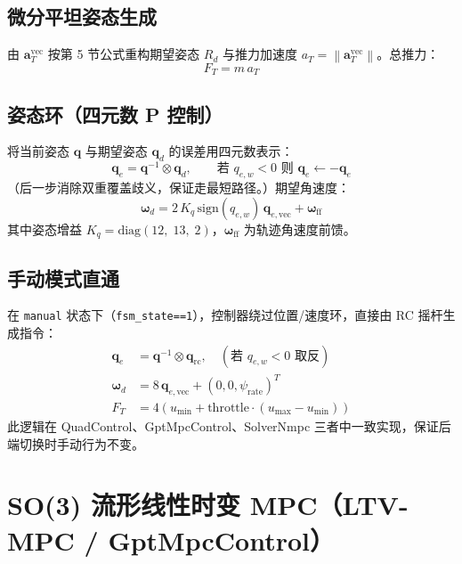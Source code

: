 \documentclass[UTF8, a4paper, 11pt]{ctexart}
\newcommand{\bq}{\mathbf{q}}
\newcommand{\bw}{\boldsymbol{\omega}}
\newcommand{\diag}{\mathrm{diag}}
\newcommand{\norm}[1]{\left\|#1\right\|}
\begin{document}
\subsection{微分平坦姿态生成}

由 $\mathbf{a}_T^{\text{vec}}$ 按第 5 节公式重构期望姿态 $R_d$ 与推力加速度 $a_T = \norm{\mathbf{a}_T^{\text{vec}}}$。总推力：
\begin{equation}
  F_T = m\,a_T
\end{equation}

\subsection{姿态环（四元数 P 控制）}

将当前姿态 $\bq$ 与期望姿态 $\bq_d$ 的误差用四元数表示：
\begin{equation}
  \bq_e = \bq^{-1}\otimes\bq_d, \qquad \text{若 } q_{e,w}<0 \text{ 则 } \bq_e \leftarrow -\bq_e
\end{equation}
（后一步消除双重覆盖歧义，保证走最短路径。）期望角速度：
\begin{equation}
  \bw_d = 2\,K_q\,\mathrm{sign}(q_{e,w})\,\bq_{e,\text{vec}} + \bw_{\text{ff}}
\end{equation}
其中姿态增益 $K_q = \diag(12,\;13,\;2)$，$\bw_{\text{ff}}$ 为轨迹角速度前馈。

\subsection{手动模式直通}

在 \texttt{manual} 状态下（\texttt{fsm\_state==1}），控制器绕过位置/速度环，直接由 RC 摇杆生成指令：
\begin{align}
  \bq_e &= \bq^{-1}\otimes\bq_{\text{rc}}, \quad (\text{若 } q_{e,w}<0 \text{ 取反})\\
  \bw_d &= 8\,\bq_{e,\text{vec}} + (0,0,\psi_{\text{rate}})^T\\
  F_T &= 4\left(u_{\min} + \text{throttle}\cdot(u_{\max}-u_{\min})\right)
\end{align}
此逻辑在 QuadControl、GptMpcControl、SolverNmpc 三者中一致实现，保证后端切换时手动行为不变。

\section{SO(3) 流形线性时变 MPC（LTV-MPC / GptMpcControl）}
\end{document}
